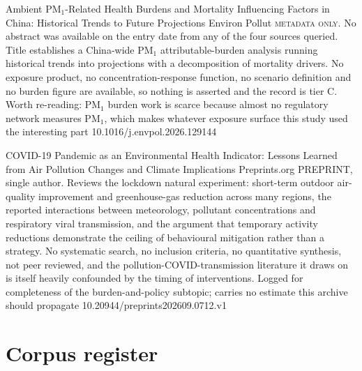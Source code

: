 \documentclass[10pt]{article}
\begin{document}

{Ambient PM$_{1}$-Related Health Burdens and Mortality Influencing Factors in China: Historical Trends to Future Projections}
{Environ Pollut}
{\textsc{metadata only.} No abstract was available on the entry date from any of the four sources queried. Title establishes a China-wide PM$_{1}$ attributable-burden analysis running historical trends into projections with a decomposition of mortality drivers. No exposure product, no concentration-response function, no scenario definition and no burden figure are available, so nothing is asserted and the record is tier C. Worth re-reading: PM$_{1}$ burden work is scarce because almost no regulatory network measures PM$_{1}$, which makes whatever exposure surface this study used the interesting part}
{10.1016/j.envpol.2026.129144}

{COVID-19 Pandemic as an Environmental Health Indicator: Lessons Learned from Air Pollution Changes and Climate Implications}
{Preprints.org}
{PREPRINT, single author. Reviews the lockdown natural experiment: short-term outdoor air-quality improvement and greenhouse-gas reduction across many regions, the reported interactions between meteorology, pollutant concentrations and respiratory viral transmission, and the argument that temporary activity reductions demonstrate the ceiling of behavioural mitigation rather than a strategy. No systematic search, no inclusion criteria, no quantitative synthesis, not peer reviewed, and the pollution-COVID-transmission literature it draws on is itself heavily confounded by the timing of interventions. Logged for completeness of the burden-and-policy subtopic; carries no estimate this archive should propagate}
{10.20944/preprints202609.0712.v1}


\clearpage

\section*{\sffamily\bfseries\color{Deep}Corpus register}
\vspace{-1.5mm}{\color{Amber}\rule{\linewidth}{1.1pt}}\vspace{2.5mm}


\end{document}
